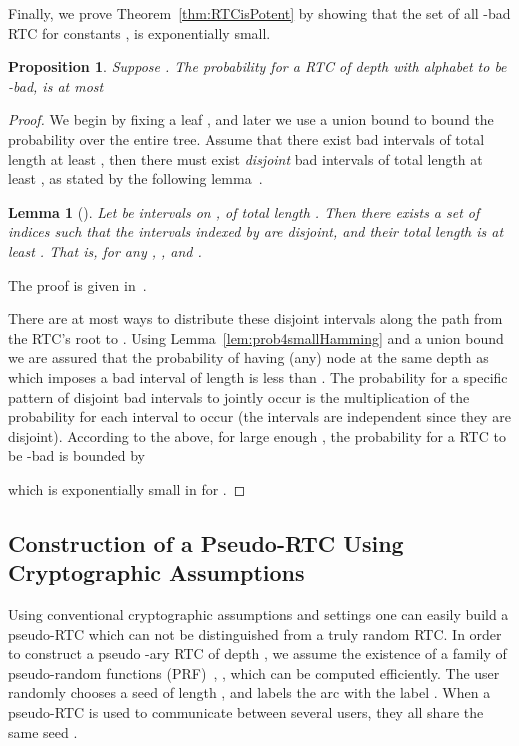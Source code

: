 \documentclass[ letterpaper, 11pt]{article}
\newtheorem{lemma}[theorem]{Lemma}
\newtheorem{proposition}[theorem]{Proposition}
\newcommand{\RTBC}{\textsf{RTC}\xspace}
\begin{document}
Finally, we prove Theorem~\ref{thm:RTCisPotent} by showing that
the set of all -bad \RTBC
for constants , is exponentially small.
\begin{proposition}\label{lem:probBadRTBC}
Suppose .
The probability for a \RTBC of depth 
with alphabet 
to be -bad,
is at most 
\end{proposition}
\begin{proof}
We begin by fixing a leaf , and later we use a union bound
to bound the probability over the entire tree.
Assume that there exist bad intervals of total length at least ,
then there must exist \emph{disjoint}
bad intervals of total length at least ,
as stated by the following lemma~\cite{schulman96}.


\begin{lemma}[\cite{schulman96}]\label{lem:intervals}
Let  be intervals on , of total length .
Then there exists a set of indices  such that
the intervals indexed by  are disjoint, and their
total length is at least . That is, for any , , and
.
\end{lemma}
\noindent The proof is given in~\cite{schulman96}.


There are at most  ways to distribute these disjoint
intervals along the path from the \RTBC's root to .
Using Lemma~\ref{lem:prob4smallHamming} and a union bound
we are assured that the probability of having
(any) node  at the same depth as  which imposes a bad interval of length  is
 less than .
The probability for a specific pattern of disjoint bad intervals
to jointly occur is the multiplication of the probability for each interval to occur
(the intervals are independent since they are disjoint).
According to the above, for large enough ,
the probability for a \RTBC to be -bad is bounded by

which is exponentially small in  for .
\end{proof}

\subsection{Construction of a Pseudo-\RTBC Using Cryptographic Assumptions}


Using conventional cryptographic assumptions
and settings one can easily build a pseudo-\RTBC which can not be
distinguished from a truly random \RTBC.
In order to construct a pseudo -ary \RTBC of depth ,
we assume the existence of a
family of pseudo-random functions (PRF)~\cite{GGM86}, ,
which can be computed efficiently.
The user randomly chooses a seed 
of length ,
and labels the arc  with the label .
When a pseudo-\RTBC is used to communicate between several
users, they all share the same seed .
\end{document}

